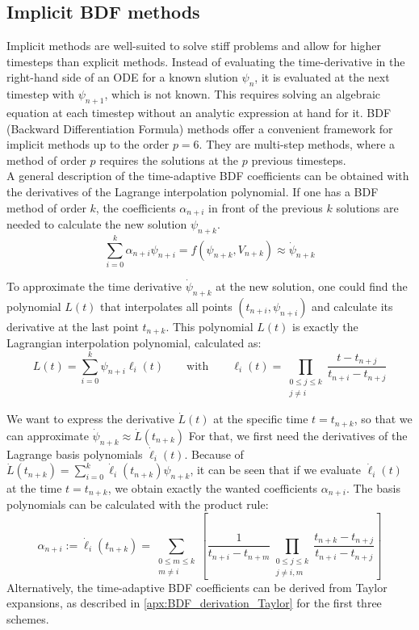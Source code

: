 \subsection{Implicit BDF methods}
Implicit methods are well-suited to solve stiff problems and allow for higher timesteps than explicit methods. Instead of evaluating the time-derivative in the right-hand side of an ODE for a known slution $\psi_n$, it is evaluated at the next timestep with $\psi_{n+1}$, which is not known. This requires solving an algebraic equation at each timestep without an analytic expression at hand for it. BDF (Backward Differentiation Formula) methods offer a convenient framework for implicit methods up to the order $p=6$. They are multi-step methods, where a method of order $p$ requires the solutions at the $p$ previous timesteps.  \\
A general description of the time-adaptive BDF coefficients can be obtained with the derivatives of the Lagrange interpolation polynomial. If one has a BDF method of order $k$, the coefficients $\alpha_{n+i}$ in front of the previous $k$ solutions are needed to calculate the new solution $\psi_{n+k}$.
\begin{equation}
	\sum_{i=0}^{k}\alpha_{n+i}\psi_{n+i} = f(\psi_{n+k},V_{n+k}) \approx \dot{\psi}_{n+k}
\end{equation} 

To approximate the time derivative $\dot{\psi}_{n+k}$ at the new solution, one could find the polynomial $L(t)$ that interpolates all points $(t_{n+i}, \psi_{n+i})$ and calculate its derivative at the last point $t_{n+k}$. This polynomial $L(t)$ is exactly the Lagrangian interpolation polynomial, calculated as:
\begin{equation}
	L(t) = \sum_{i=0}^{k}\psi_{n+i}\ell_i(t) \qquad\text{with}\qquad \ell_i(t) = \prod_{\substack{0\le j\le k \\j \ne i}}\frac{t-t_{n+j}}{t_{n+i}-t_{n+j}}
\end{equation}

We want to express the derivative $\dot{L}(t)$ at the specific time $t=t_{n+k}$, so that we can approximate $\dot{\psi}_{n+k} \approx \dot{L}(t_{n+k})$ For that, we first need the derivatives of the Lagrange basis polynomials $\dot{\ell}_i(t)$. Because of $\dot{L}(t_{n+k}) = \sum_{i=0}^{k}\dot{\ell}_i(t_{n+k})\psi_{n+k}$, it can be seen that if we evaluate $\dot{\ell}_i(t)$ at the time $t=t_{n+k}$, we obtain exactly the wanted coefficients $\alpha_{n+i}$. The basis polynomials can be calculated with the product rule:
\begin{equation}
	\alpha_{n+i} := \dot{\ell}_i(t_{n+k}) = \sum_{\substack{0\le m\le k \\m \ne i}}\left[\frac{1}{t_{n+i}-t_{n+m}}\prod_{\substack{0\le j\le k \\j \ne i,m}}\frac{t_{n+k}-t_{n+j}}{t_{n+i}-t_{n+j}}\right]
\end{equation}
Alternatively, the time-adaptive BDF coefficients can be derived from Taylor expansions, as described in \autoref{apx:BDF_derivation_Taylor} for the first three schemes.

